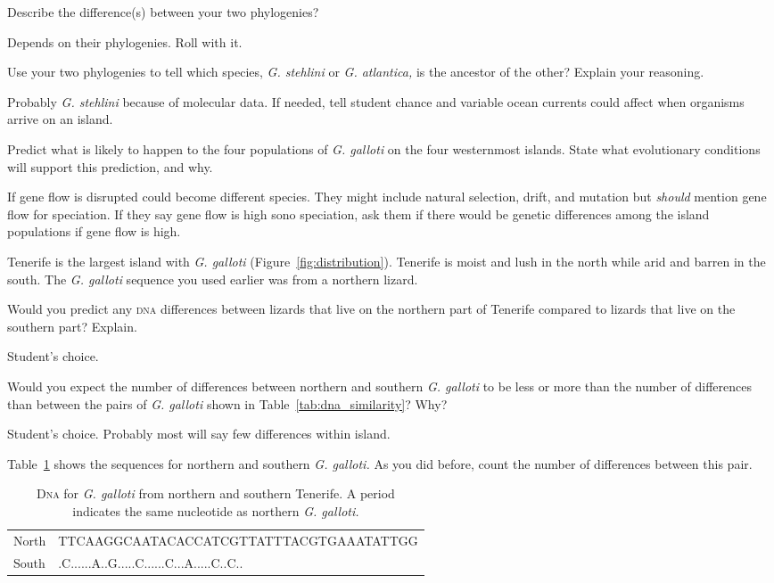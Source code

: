 \documentclass[12pt, hidelinks]{exam}
\newcommand*\AnswerBox[2]{%
    \parbox[t][#1]{0.92\textwidth}{%
    \begin{solution}#2\end{solution}}
    \vspace{\stretch{1}}
}
\begin{document}
\begin{questions}
\question Describe the difference(s) between your two phylogenies? 

\AnswerBox{2\baselineskip}{Depends on their phylogenies. Roll with it.}

\question
Use your two phylogenies to tell which species, \textit{G. stehlini} or \textit{G. atlantica,} is the ancestor of the other? Explain your reasoning. 

\AnswerBox{3\baselineskip}{Probably \textit{G. stehlini} because of molecular data. If needed, tell student chance and variable ocean currents could affect when organisms arrive on an island.}

\question
Predict what is likely to happen to the four populations of \textit{G. galloti} on the four westernmost islands. State what evolutionary conditions will support this prediction, and why.

\AnswerBox{3\baselineskip}{If gene flow is disrupted could become different species. They might include natural selection, drift, and mutation but \emph{should} mention gene flow for speciation. If they say gene flow is high sono speciation, ask them if there would be genetic differences among the island populations if gene flow is high.}

\newpage

Tenerife is the largest island with \textit{G. galloti} (Figure~\ref{fig:distribution}). Tenerife is moist and lush in the north while arid and barren in the south. The \textit{G. galloti} sequence you used earlier was from a northern lizard. 

\question
Would you predict any \textsc{dna} differences between lizards that live on the northern part of Tenerife compared to lizards that live on the southern part? Explain.

\AnswerBox{2\baselineskip}{Student's choice.}

\question
Would you expect the number of differences between northern and southern \textit{G. galloti} to be less or more than the number of differences than between the pairs of \textit{G. galloti} shown in Table~\ref{tab:dna_similarity}? Why?

\AnswerBox{2\baselineskip}{Student's choice. Probably most will say few differences within island.}

\question
Table~\ref{tab:galloti} shows the sequences for northern and southern \textit{G. galloti.} As you did before, count the number of differences between this pair.

{\dnatable
\begin{longtable}[l]{ll}
\caption{D\textsc{na} for \textit{G. galloti} from northern and southern Tenerife. A period \\indicates the same nucleotide as northern \textit{G. galloti.}\label{tab:galloti}}\tabularnewline
\toprule
{\regfont North} & TTCAAGGCAATACACCATCGTTATTTACGTGAAATATTGG \tabularnewline
{\regfont South} & .C......A..G.....C......C...A.....C..C.. \tabularnewline
\bottomrule
\end{longtable}
}


\end{questions}
\end{document}
